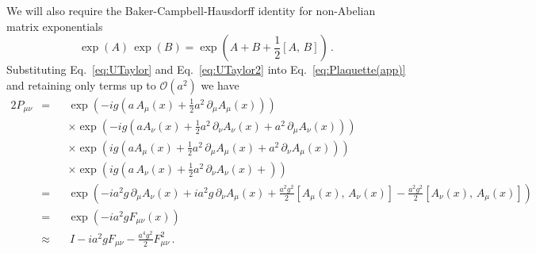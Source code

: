 We will also require the Baker-Campbell-Hausdorff identity for non-Abelian matrix exponentials
%
\begin{equation}
\exp(A)\,\exp(B) = \exp\left(A + B +\frac{1}{2}[A,\,B]\right)\, .
\label{eq:BCH}
\end{equation}
%
Substituting Eq.~\eqref{eq:UTaylor} and Eq.~\eqref{eq:UTaylor2} into Eq.~\eqref{eq:Plaquette(app)} and retaining only terms up to $\mathcal{O}(a^2)$ we have
%
\begin{alignat*}{2}
P_{\mu\nu} &= &&\exp\left(-ig\left(a\,A_\mu(x)+\frac{1}{2}a^2\,\partial_\mu A_\mu(x) \right)\right)\\
& &&\times\exp\left(-ig\left(aA_\nu(x) + \frac{1}{2}a^2\,\partial_\nu A_\nu(x) + a^2\,\partial_\mu A_\nu(x)\right)\right)\\
& &&\times\exp\left(ig\left(aA_\mu(x) + \frac{1}{2}a^2\,\partial_\mu A_\mu(x) + a^2\,\partial_\nu A_\mu(x)\right)\right)\\
& &&\times\exp\left(ig\left(a\,A_\nu(x)+\frac{1}{2}a^2\,\partial_\nu A_\nu(x) + \right)\right)\\
&= &&\exp\left(-ia^2g\,\partial_\mu A_\nu(x) + ia^2g\,\partial_\nu A_\mu(x) +\frac{a^2g^2}{2}[A_\mu(x),\,A_\nu(x)] - \frac{a^2g^2}{2}[A_\nu(x),\,A_\mu(x)]\right)\\
&= &&\exp\left(-ia^2g F_{\mu\nu}(x)\right)\\
&\approx &&\, I - ia^2 g F_{\mu\nu} -\frac{a^4 g^2}{2} F_{\mu\nu}^2\, .
\end{alignat*}

